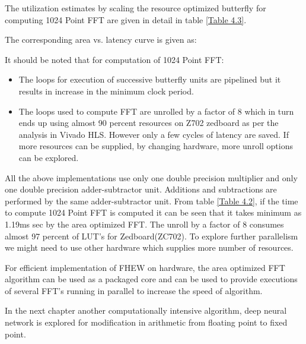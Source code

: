 






\noindent The utilization estimates by scaling the resource optimized butterfly for computing 1024 Point FFT are given in detail in table \ref{Table 4.3}.



The corresponding area vs. latency curve is given as:  

\noindent It should be noted that for computation of 1024 Point FFT:
\begin{itemize}
\item
The loops for execution of successive butterfly units are pipelined but it results in increase in the minimum clock period. 
\item
The loops used to compute FFT are unrolled by a factor of 8 which in turn ends up using almost 90 percent resources on Z702 zedboard as per the analysis in Vivado HLS. However only a few cycles of latency are saved. If more resources can be supplied, by changing hardware, more unroll options can be explored. 
\end{itemize}


All the above implementations use only one double precision multiplier and only one double precision adder-subtractor unit. Additions and subtractions are performed by the same adder-subtractor unit. 
From table \ref{Table 4.2}, if the time to compute 1024 Point FFT is computed it can be seen that it takes minimum as 1.19ms sec by the area optimized FFT. The unroll by a factor of 8 consumes almost 97 percent of LUT's for Zedboard(ZC702). To explore further parallelism we might need to use other hardware which supplies more number of resources. 



For efficient implementation of FHEW on hardware, the area optimized FFT algorithm can be used as a packaged core and can be used to provide executions of several FFT's running in parallel to increase the speed of algorithm. 

%

In the next chapter another computationally intensive algorithm, deep neural network is explored for modification in arithmetic from floating point to fixed point.




